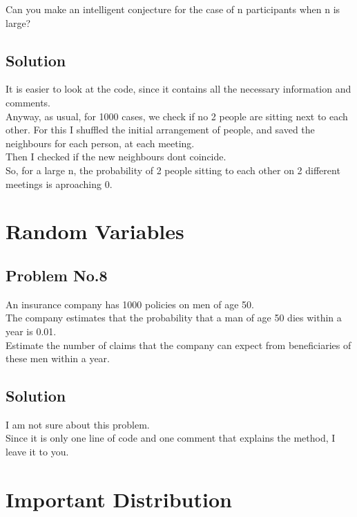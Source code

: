 \documentclass{article}
\begin{document}
    Can you make an intelligent conjecture for the case of n participants when n is large?

    \subsection{Solution}

    It is easier to look at the code, since it contains all the necessary information
    and comments.\\
    Anyway, as usual, for 1000 cases, we check if no 2 people are sitting next
    to each other. For this I shuffled the initial arrangement of people, and
    saved the neighbours for each person, at each meeting.\\
    Then I checked if the new neighbours dont coincide.\\
    So, for a large n, the probability of 2 people sitting to each other on 2
    different meetings is aproaching 0.


  \newpage

  \section{Random Variables}

    \subsection{Problem No.8}

    An insurance company has 1000 policies on men of age 50.\\
    The company estimates that
    the probability that a man of age 50 dies within a year is 0.01.\\
    Estimate the number of claims that
    the company can expect from beneficiaries of these men within a year.


    \subsection{Solution}

    I am not sure about this problem.\\
    Since it is only one line of code and one comment that explains the method,
    I leave it to you.

  \newpage

  \section{Important Distribution}
\end{document}
